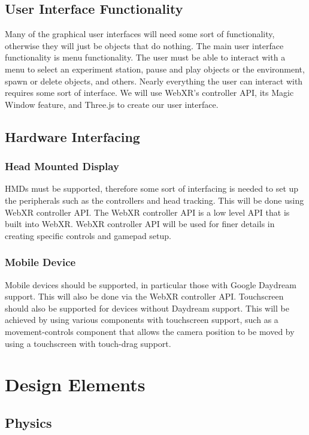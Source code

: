 \documentclass[onecolumn, draftclsnofoot,10pt, compsoc]{IEEEtran}
\begin{document}
\subsection{User Interface Functionality}
Many of the graphical user interfaces will need some sort of functionality, otherwise they will just be objects that do nothing. The main user interface functionality is menu functionality. The user must be able to interact with a menu to select an experiment station, pause and play objects or the environment, spawn or delete objects, and others. Nearly everything the user can interact with requires some sort of interface. We will use WebXR's controller API, its Magic Window feature, and Three.js to create our user interface.

\subsection{Hardware Interfacing}
\subsubsection{Head Mounted Display}
HMDs must be supported, therefore some sort of interfacing is needed to set up the peripherals such as the controllers and head tracking. This will be done using WebXR controller API. The WebXR controller API is a low level API that is built into WebXR. WebXR controller API will be used for finer details in creating specific controls and gamepad setup.

\subsubsection{Mobile Device}
Mobile devices should be supported, in particular those with Google Daydream support. This will also be done via the WebXR controller API. Touchscreen should also be supported for devices without Daydream support. This will be achieved by using various components with touchscreen support, such as a movement-controls component that allows the camera position to be moved by using a touchscreen with touch-drag support.

\section{Design Elements}

\subsection{Physics}
\end{document}
